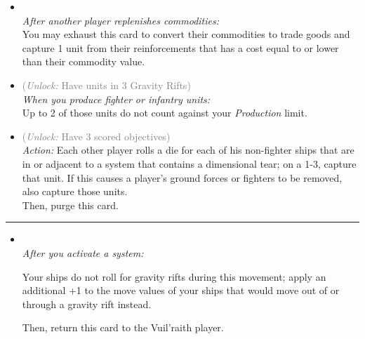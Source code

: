 \begin{multicols}{2}

\begin{itemize}
\item {}\\
\emph{After another player replenishes commodities:}
\\
You may exhaust this card to convert their commodities to trade goods and capture 1 unit from their reinforcements that has a cost equal to or lower than their commodity value.
\item {} \textcolor{gray}{(\emph{Unlock:} Have units in 3 Gravity Rifts)}\\
\emph{When you produce fighter or infantry units:}
\\
Up to 2 of those units do not count against your \emph{Production} limit. 
\item {} \textcolor{gray}{(\emph{Unlock:} Have 3 scored objectives)}\\
\emph{Action:} Each other player rolls a die for each of his non-fighter ships that are in or adjacent to a system that contains a dimensional tear; on a 1-3, capture that unit. If this causes a player's ground forces or fighters to be removed, also capture those units.\\
Then, purge this card.
\end{itemize}

\vspace{-10pt}\rule{\hsize}{0.4pt}\vspace{5pt}


\begin{itemize}
\item {}\\
\emph{After you activate a system:}

Your ships do not roll for gravity rifts during this movement; apply an additional +1 to the move values of your ships that would move out of or through a gravity rift instead.

Then, return this card to the Vuil'raith player. 
\end{itemize}

\end{multicols}



